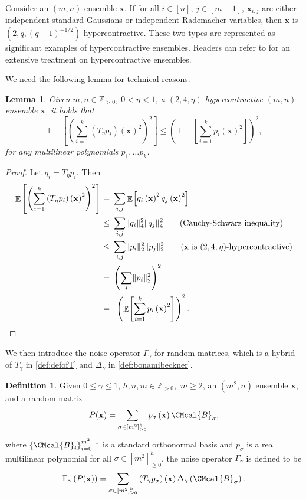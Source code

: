 \documentclass[10pt,a4paper]{article}
\def\B{\CMcal{B}}
\theoremstyle{plain}
\newtheorem{lemma}[theorem]{Lemma}
\theoremstyle{definition}
\newtheorem{definition}[theorem]{Definition}
\newcommand {\minusspace} {\: \! \!}
\newcommand {\Fn} [2] {\ensuremath{ #1 \minusspace \Br{ #2 } }}
\newcommand {\set} [1] {\ensuremath{ \left\lbrace #1 \right\rbrace }}
\newcommand {\br} [1] {\ensuremath{ \left( #1 \right) }}
\newcommand {\Br} [1] {\ensuremath{ \left[ #1 \right] }}
\DeclarePairedDelimiter{\norm}{\lVert}{\rVert}
\newcommand {\normsub} [2] {\ensuremath{ \norm{#1}_{#2} }}
\newcommand {\twonorm} [1] {\normsub{#1}{2}}
\DeclareMathOperator*{\bigE}{\mathbb{E}}
\newcommand {\expec} [2] {\Fn{\bigE_{\substack{#1}}}{#2}}
\newcommand{\posint}{{\mathbb Z}_{>0}}
\newcommand{\randx}{\ensuremath{\mathbf{x}}}
\newcommand{\1}{\mathbb{1}} %
\begin{document}
Consider an $(m,n)$ ensemble $\randx$. If for all $i\in[n]$, $j\in[m-1]$, $\randx_{i,j}$ are either independent standard Gaussians or independent Rademacher variables, then $\randx$ is $(2,q,(q-1)^{-1/2})$-hypercontractive. These two types are represented as significant examples of hypercontractive ensembles. Readers can refer to \cite{mossel2005noise} for an extensive treatment on hypercontractive ensembles.

We need the following lemma for technical reasons.
\begin{lemma}\label{lem:gausshyper}
	Given $m,n\in\posint$, $0<\eta<1$, a $(2,4,\eta)$-hypercontractive $(m,n)$ ensemble $\randx$, it holds that 
	\[\expec{ }{\br{\sum_{i=1}^k \br{T_{\eta}p_i}\br{\mathbf{x}}^2}^2}\leq\br{\expec{ }{\sum_{i=1}^kp_i\br{\mathbf{x}}^2}}^{2},\]
  for any multilinear polynomials $p_1,\ldots p_k$.
\end{lemma}



	
\begin{proof}
	Let $q_i= T_{\eta}p_i$. Then
	\begin{align*}
		\expec{ }{\br{\sum_{i=1}^k\br{T_{\eta}p_i}\br{\mathbf{x}}^2}^2}=~&\sum_{i, j}\expec{}{q_i\br{\mathbf{x}}^2q_j\br{\mathbf{x}}^2}\\
		\leq~&\sum_{i,j}\norm{q_i}_4^2\norm{q_j}_4^2\quad\quad\mbox{(Cauchy-Schwarz inequality)}\\
		\leq~&\sum_{i,j}\twonorm{p_i}^2\twonorm{p_j}^2\quad\quad\mbox{(\randx ~is $(2,4,\eta)$-hypercontractive)}\\
		=~&\br{\sum_i\twonorm{p_i}^2}^{2}\\
  =~&~\br{\expec{ }{\sum_{i=1}^kp_i\br{\mathbf{x}}^2}}^{2}.
	\end{align*}
\end{proof}

We then introduce the noise operator $\Gamma_{\gamma}$ for random matrices, which is a hybrid of $T_{\gamma}$ in \cref{def:defofT} and $\Delta_{\gamma}$ in \cref{def:bonamibeckner}.
	\begin{definition}\label{def:gamma}
	Given $0\leq\gamma\leq 1$, $h,n,m\in\posint,$ $m\geq 2$, an $(m^2,n)$ ensemble $\randx$, and a random matrix
 \begin{equation*}
	P(\randx)=\sum_{\sigma\in\Br{m^2}_{\geq0}^h}p_\sigma\br{\randx}\B_\sigma,
	\end{equation*}
	where $\set{\B_i}_{i=0}^{m^2-1}$ is a standard orthonormal basis and $p_\sigma$ is a real multilinear polynomial for all $\sigma\in\Br{m^2}_{\geq0}^h$, the noise operator $\Gamma_{\gamma}$ is defined to be	\[\Gamma_{\gamma}\br{P(\randx)}=\sum_{\sigma\in\Br{m^2}_{\geq0}^h}\br{T_\gamma p_\sigma}\br{\randx}\Delta_\gamma\br{\B_\sigma}.\]
\end{definition}
\end{document}
